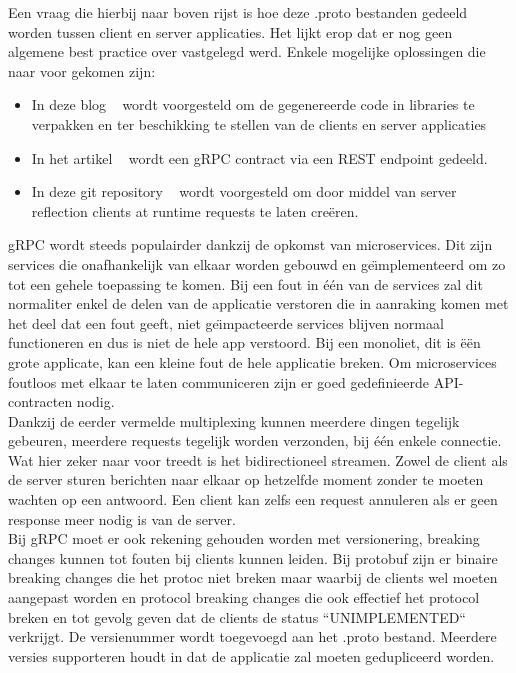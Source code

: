 Een vraag die hierbij naar boven rijst is hoe deze .proto bestanden gedeeld worden tussen client en server applicaties.
Het lijkt erop dat er nog geen algemene best practice over vastgelegd werd. Enkele mogelijke oplossingen
die naar voor gekomen zijn:
\begin{itemize}
    \item In deze blog ~\parencite{protofilesharingSol1} wordt voorgesteld om de gegenereerde code in libraries te verpakken en ter beschikking te stellen van de clients en server applicaties
    \item In het artikel ~\parencite{protofilesharingSol2} wordt een gRPC contract via een REST endpoint gedeeld.
    \item In deze git repository ~\parencite{protofilesharingSol3} wordt voorgesteld om door middel van server reflection clients at runtime requests te laten cre\"eren.
\end{itemize}

gRPC wordt steeds populairder dankzij de opkomst van microservices. Dit zijn services die onafhankelijk van elkaar worden gebouwd en ge\"{\i}mplementeerd om
zo tot een gehele toepassing te komen. Bij een fout in \'e\'en van de services zal dit normaliter enkel de delen van de applicatie verstoren die in aanraking komen
met het deel dat een fout geeft, niet ge\"{\i}mpacteerde services blijven normaal functioneren en dus is niet de hele app verstoord. Bij een monoliet, dit is \"e\"en grote applicate,
kan een kleine fout de hele applicatie breken. Om microservices foutloos met elkaar te laten communiceren zijn er goed gedefinieerde API-contracten nodig.\newline
~\autocite{microsoft}\\

Dankzij de eerder vermelde multiplexing kunnen meerdere dingen tegelijk gebeuren, meerdere requests tegelijk worden verzonden, bij \'e\'en enkele connectie.
Wat hier zeker naar voor treedt is het bidirectioneel streamen. Zowel de client als de server sturen berichten naar elkaar op hetzelfde moment zonder te moeten wachten
op een antwoord. Een client kan zelfs een request annuleren als er geen response meer nodig is van de server.\newline
~\autocite{freecodecamp}\\

Bij gRPC moet er ook rekening gehouden worden met versionering, breaking changes kunnen tot fouten bij clients kunnen leiden.
Bij protobuf zijn er binaire breaking changes die het protoc niet breken maar waarbij de clients wel moeten aangepast worden en protocol breaking changes
die ook effectief het protocol breken en tot gevolg geven dat de clients de status ``UNIMPLEMENTED`` verkrijgt. De versienummer wordt toegevoegd aan
het .proto bestand. Meerdere versies supporteren houdt in dat de applicatie zal moeten gedupliceerd worden.\\

